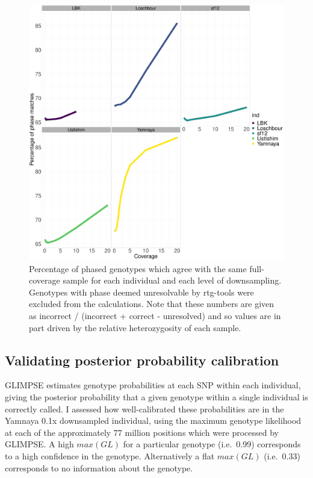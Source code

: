 {\begin{figure}[htp]
    \centering
    \includegraphics[width=1.0\textwidth]{../images/chapter1/phasing_performance_downsampled.pdf}
    \caption{Percentage of phased genotypes which agree with the same full-coverage sample for each individual and each level of downsampling. Genotypes with phase deemed unresolvable by rtg-tools were excluded from the calculations. Note that these numbers are given as incorrect / (incorrect + correct - unresolved) and so values are in part driven by the relative heterozygosity of each sample.}
    \label{fig:phasing_performance_downsampled}
\end{figure}

\subsection{Validating posterior probability calibration}

GLIMPSE estimates genotype probabilities at each SNP within each individual, giving the posterior probability that a given genotype within a single individual is correctly called. I assessed how well-calibrated these probabilities are in the Yamnaya 0.1x downsampled individual, using the maximum genotype likelihood at each of the approximately 77 million positions which were processed by GLIMPSE. A high $max(GL)$ for a particular genotype (i.e.\ 0.99) corresponds to a high confidence in the genotype. Alternatively a flat $max(GL)$ (i.e.\ 0.33) corresponds to no information about the genotype. 

}
